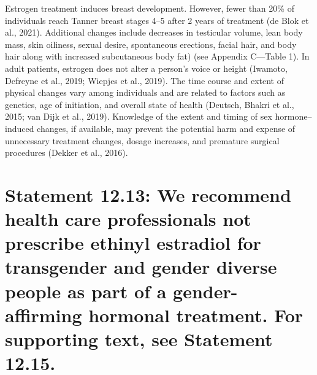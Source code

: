 \documentclass[
]{book}
\begin{document}
Estrogen treatment induces breast development.
However, fewer than 20\% of individuals reach
Tanner breast stages 4--5 after 2 years of treatment (de Blok et al., 2021). Additional changes
include decreases in testicular volume, lean body
mass, skin oiliness, sexual desire, spontaneous
erections, facial hair, and body hair along with
increased subcutaneous body fat) (see Appendix
C---Table 1). In adult patients, estrogen does not
alter a person's voice or height (Iwamoto, Defreyne
et al., 2019; Wiepjes et al., 2019).
The time course and extent of physical changes
vary among individuals and are related to factors
such as genetics, age of initiation, and overall
state of health (Deutsch, Bhakri et al., 2015; van
Dijk et al., 2019). Knowledge of the extent and
timing of sex hormone--induced changes, if available, may prevent the potential harm and expense
of unnecessary treatment changes, dosage
increases, and premature surgical procedures
(Dekker et al., 2016).

\hypertarget{statement-12.13-we-recommend-health-care-professionals-not-prescribe-ethinyl-estradiol-for-transgender-and-gender-diverse-people-as-part-of-a-gender-affirming-hormonal-treatment.-for-supporting-text-see-statement-12.15.}{%
\section*{Statement 12.13: We recommend health care professionals not prescribe ethinyl estradiol for transgender and gender diverse people as part of a gender-affirming hormonal treatment. For supporting text, see Statement 12.15.}\label{statement-12.13-we-recommend-health-care-professionals-not-prescribe-ethinyl-estradiol-for-transgender-and-gender-diverse-people-as-part-of-a-gender-affirming-hormonal-treatment.-for-supporting-text-see-statement-12.15.}}
\end{document}
